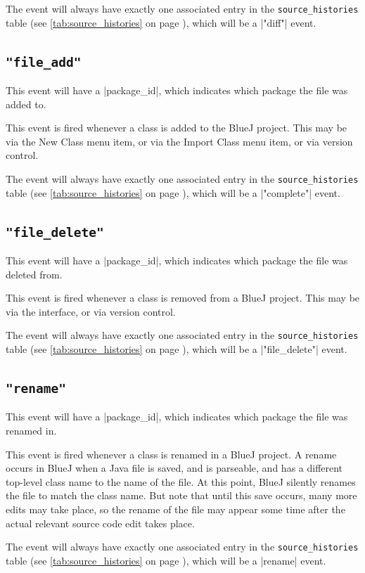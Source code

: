 \documentclass{report}
\newcommand{\myref}[1]{\autoref{#1} on page \pageref*{#1}}
\newcommand{\tabref}[1]{\lstinline|#1| table (see \myref{tab:#1})}
\begin{document}
The event will always have exactly one associated entry in the
\tabref{source_histories}, which will be a |"diff"| event.

\subsection{\lstinline!"file_add"!}
\label{evt:file_add}

This event will have a |package_id|, which indicates which package the file
was added to.

This event is fired whenever a class is added to the BlueJ project.  This may
be via the New Class menu item, or via the Import Class menu item, or via
version control.

The event will always have exactly one associated entry in the
\tabref{source_histories}, which will be a |"complete"| event.

\subsection{\lstinline!"file_delete"!}
\label{evt:file_delete}

This event will have a |package_id|, which indicates which package the file
was deleted from.

This event is fired whenever a class is removed from a BlueJ project.  This
may be via the interface, or via version control.

The event will always have exactly one associated entry in the
\tabref{source_histories}, which will be a |"file_delete"| event.

\subsection{\lstinline!"rename"!}
\label{evt:rename}

This event will have a |package_id|, which indicates which package the file
was renamed in.

This event is fired whenever a class is renamed in a BlueJ project.  A rename
occurs in BlueJ when a Java file is saved, and is parseable, and has a
different top-level class name to the name of the file.  At this point, BlueJ
silently renames the file to match the class name.  But note that until this
save occurs, many more edits may take place, so the rename of the file may
appear some time after the actual relevant source code edit takes place.

The event will always have exactly one associated entry in the
\tabref{source_histories}, which will be a |rename| event.
\end{document}
